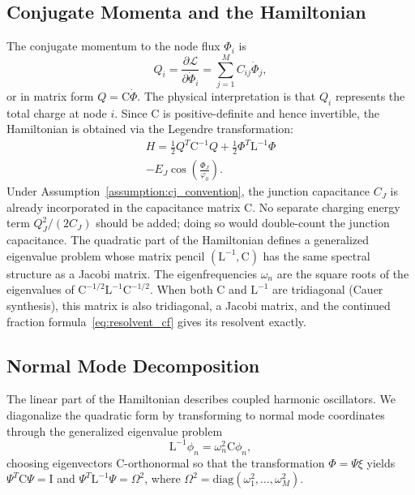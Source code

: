 \documentclass[reprint, floatfix, superscriptaddress, amsmath, amssymb, longbibliography]{revtex4-2}
\begin{document}
\subsection{Conjugate Momenta and the Hamiltonian}
\label{sec:hamiltonian}

The conjugate momentum to the node flux $\Phi_i$ is
\begin{equation}
Q_i = \frac{\partial \mathcal{L}}{\partial \dot{\Phi}_i} = \sum_{j=1}^{M} C_{ij} \dot{\Phi}_j,
\label{eq:conjugate_momentum}
\end{equation}
or in matrix form ${Q} = \mathrm{C} \dot{{\Phi}}$. The physical interpretation is that $Q_i$ represents the total charge at node $i$. Since $\mathrm{C}$ is positive-definite and hence invertible, the Hamiltonian is obtained via the Legendre transformation:
\begin{multline}
H = \frac{1}{2} {Q}^T \mathrm{C}^{-1} {Q} + \frac{1}{2} {\Phi}^T \mathrm{L}^{-1} {\Phi} \\
- E_J \cos\left(\frac{\Phi_J}{\varphi_0}\right).
\label{eq:hamiltonian}
\end{multline}
Under Assumption~\ref{assumption:cj_convention}, the junction capacitance $C_J$ is already incorporated in the capacitance matrix $\mathrm{C}$. No separate charging energy term $Q_J^2/(2C_J)$ should be added; doing so would double-count the junction capacitance. The quadratic part of the Hamiltonian defines a generalized eigenvalue problem whose matrix pencil $(\mathrm{L}^{-1}, \mathrm{C})$ has the same spectral structure as a Jacobi matrix. The eigenfrequencies $\omega_n$ are the square roots of the eigenvalues of $\mathrm{C}^{-1/2} \mathrm{L}^{-1} \mathrm{C}^{-1/2}$. When both $\mathrm{C}$ and $\mathrm{L}^{-1}$ are tridiagonal (Cauer synthesis), this matrix is also tridiagonal, a Jacobi matrix, and the continued fraction formula~\eqref{eq:resolvent_cf} gives its resolvent exactly.

\subsection{Normal Mode Decomposition}
\label{sec:normal_modes}


The linear part of the Hamiltonian describes coupled harmonic oscillators. We diagonalize the quadratic form by transforming to normal mode coordinates through the generalized eigenvalue problem
\begin{equation}
\mathrm{L}^{-1} {\phi}_n = \omega_n^2 \mathrm{C} {\phi}_n,
\label{eq:generalized_eigenvalue}
\end{equation}
choosing eigenvectors $\mathrm{C}$-orthonormal so that the transformation ${\Phi} = \Psi{\xi}$ yields $\Psi^T \mathrm{C} \Psi = \mathrm{I}$ and $\Psi^T \mathrm{L}^{-1} \Psi = \Omega^2$, where $\Omega^2 = \mathrm{diag}(\omega_1^2, \ldots, \omega_M^2)$.
\end{document}

